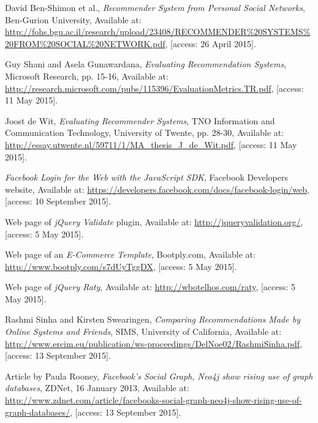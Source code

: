 \documentclass[12pt]{report}
\begin{document}
\begin{thebibliography}{99}
David Ben-Shimon et al., \textit{Recommender System from Personal Social Networks}, Ben-Gurion University, Available at: \url{http://fohs.bgu.ac.il/research/upload/23408/RECOMMENDER%20SYSTEMS%20FROM%20SOCIAL%20NETWORK.pdf}, [access: 26 April 2015].

Guy Shani and Asela Gunawardana, \textit{Evaluating Recommendation Systems}, Microsoft Research, pp. 15-16, Available at: \url{http://research.microsoft.com/pubs/115396/EvaluationMetrics.TR.pdf}, [access: 11 May 2015].

Joost de Wit, \textit{Evaluating Recommender Systems}, TNO Information and Communication Technology, University of Twente, pp. 28-30, Available at: \url{http://essay.utwente.nl/59711/1/MA_thesis_J_de_Wit.pdf}, [access: 11 May 2015].

\textit{Facebook Login for the Web with the JavaScript SDK}, Facebook Developers website, Available at: \url{https://developers.facebook.com/docs/facebook-login/web}, [access: 10 September 2015].

Web page of \textit{jQuery Validate} plugin, Available at: \url{http://jqueryvalidation.org/}, [access: 5 May 2015].

Web page of an \textit{E-Commerce Template}, Bootply.com, Available at: \url{http://www.bootply.com/s7dUyTggDX}, [access: 5 May 2015].

Web page of \textit{jQuery Raty}, Available at: \url{http://wbotelhos.com/raty}, [access: 5 May 2015].

Rashmi Sinha and Kirsten Swearingen, \textit{Comparing Recommendations Made by Online Systems and Friends}, SIMS, University of California, Available at: \url{http://www.ercim.eu/publication/ws-proceedings/DelNoe02/RashmiSinha.pdf}, [access: 13 September 2015].

Article by Paula Rooney, \textit{Facebook's Social Graph, Neo4j show rising use of graph databases}, ZDNet, 16 January 2013, Available at: \url{http://www.zdnet.com/article/facebooks-social-graph-neo4j-show-rising-use-of-graph-databases/}, [access: 13 September 2015].

\end{thebibliography}

\listoffigures

\listoftables

\listoflistings
\end{document}
